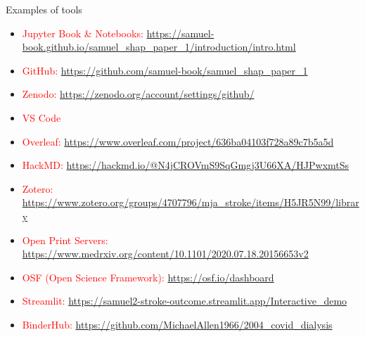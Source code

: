\documentclass[xcolor={usenames,dvipsnames}]{beamer}
\newcommand{\smallurl}[1]{\textcolor{blue}{\fontsize{5pt}{5.8pt}\selectfont \url{#1}}}
\begin{document}

\begin{frame}{Examples of tools}

\footnotesize

\begin{itemize}
    \item \textcolor{red}{Jupyter Book \& Notebooks:} 
    \smallurl{https://samuel-book.github.io/samuel_shap_paper_1/introduction/intro.html}
    \item \textcolor{red}{GitHub:} 
    \smallurl{https://github.com/samuel-book/samuel_shap_paper_1}
    \item \textcolor{red}{Zenodo:} 
    \smallurl{https://zenodo.org/account/settings/github/}
    \item \textcolor{red}{VS Code}
    \item \textcolor{red}{Overleaf:}
    \smallurl{https://www.overleaf.com/project/636ba04103f728a89c7b5a5d}
    \item \textcolor{red}{HackMD: }
    \smallurl{https://hackmd.io/@N4jCROVmS9SqGmgj3U66XA/HJPwxmtSs}
    \item \textcolor{red}{Zotero: }
    \smallurl{https://www.zotero.org/groups/4707796/mja_stroke/items/H5JR5N99/library}
    \item \textcolor{red}{Open Print Servers:}
    \smallurl{https://www.medrxiv.org/content/10.1101/2020.07.18.20156653v2}
    \item \textcolor{red}{OSF (Open Science Framework):}
    \smallurl{https://osf.io/dashboard}
    \item \textcolor{red}{Streamlit: }
    \smallurl{https://samuel2-stroke-outcome.streamlit.app/Interactive_demo}
    \item \textcolor{red}{BinderHub: }
    \smallurl{https://github.com/MichaelAllen1966/2004_covid_dialysis}
    
    
\end{itemize}


\end{frame}

\end{document}
